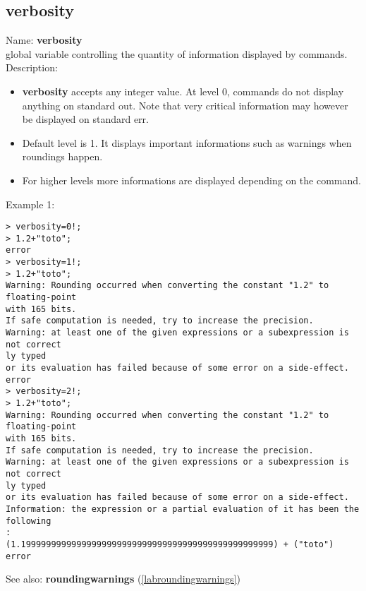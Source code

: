 \subsection{verbosity}
\label{labverbosity}
\noindent Name: \textbf{verbosity}\\
global variable controlling the quantity of information displayed by commands.\\

\noindent Description: \begin{itemize}

\item \textbf{verbosity} accepts any integer value. At level 0, commands do not display anything
   on standard out. Note that very critical information may however be displayed on
   standard err.

\item Default level is 1. It displays important informations such as warnings when 
   roundings happen.

\item For higher levels more informations are displayed depending on the command.
\end{itemize}
\noindent Example 1: 
\begin{center}\begin{minipage}{15cm}\begin{Verbatim}[frame=single]
> verbosity=0!;
> 1.2+"toto";
error
> verbosity=1!;
> 1.2+"toto";
Warning: Rounding occurred when converting the constant "1.2" to floating-point 
with 165 bits.
If safe computation is needed, try to increase the precision.
Warning: at least one of the given expressions or a subexpression is not correct
ly typed
or its evaluation has failed because of some error on a side-effect.
error
> verbosity=2!;
> 1.2+"toto";
Warning: Rounding occurred when converting the constant "1.2" to floating-point 
with 165 bits.
If safe computation is needed, try to increase the precision.
Warning: at least one of the given expressions or a subexpression is not correct
ly typed
or its evaluation has failed because of some error on a side-effect.
Information: the expression or a partial evaluation of it has been the following
:
(1.19999999999999999999999999999999999999999999999999) + ("toto")
error
\end{Verbatim}
\end{minipage}\end{center}
See also: \textbf{roundingwarnings} (\ref{labroundingwarnings})
